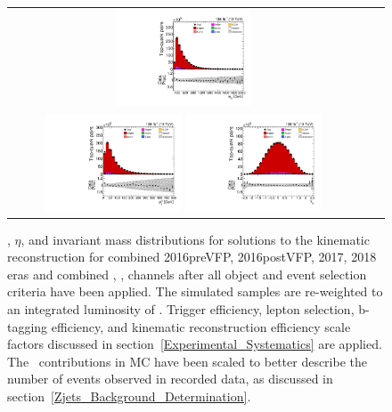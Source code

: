 \begin{figure}[htb]
    \begin{center}
        \begin{tabular}{ccc}
            \includegraphics[width=0.40\textwidth]{fig_fullRun2UL/controlplots/combined/HypTTBarMass.pdf} \\
            \includegraphics[width=0.40\textwidth]{fig_fullRun2UL/controlplots/combined/HypTTBarpT.pdf} 
            \includegraphics[width=0.40\textwidth]{fig_fullRun2UL/controlplots/combined/HypTTBarRapidity.pdf} \\
        \end{tabular}
        \caption{\footnotesize \pT, $\eta$, and invariant mass distributions for \ttbar solutions to the kinematic reconstruction for combined 2016preVFP, 2016postVFP, 2017, 2018 eras and combined \ee, \emu, \mumu channels after all object and event selection criteria have been applied.
        The simulated samples are re-weighted to an integrated luminosity of \lumivalueRuniiUL.
        Trigger efficiency, lepton selection, b-tagging efficiency, and kinematic reconstruction efficiency scale factors discussed in section~\ref{Experimental_Systematics} are applied.
        The \zjets\ contributions in MC have been scaled to better describe the number of events observed in recorded data, as discussed in section~\ref{Zjets_Background_Determination}.
        }
    \end{center}
\end{figure}


